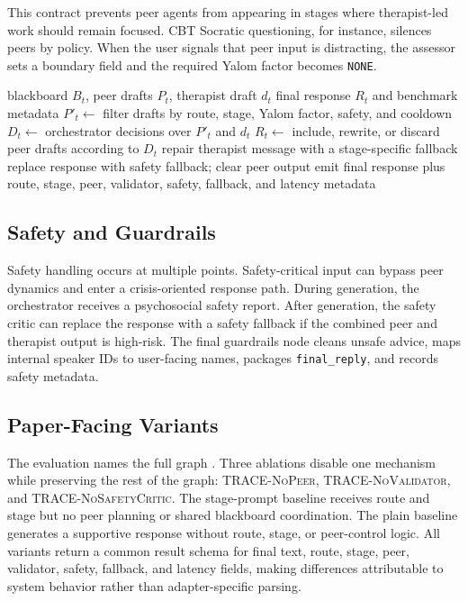 This contract prevents peer agents from appearing in stages where therapist-led work should remain focused. CBT Socratic questioning, for instance, silences peers by policy. When the user signals that peer input is distracting, the assessor sets a boundary field and the required Yalom factor becomes \texttt{NONE}.

\begin{algorithm}[t]
\small
\caption{Peer Gating and Response Finalization}
\label{alg:peer_response}
\begin{algorithmic}[1]
\Require blackboard $B_t$, peer drafts $P_t$, therapist draft $d_t$
\Ensure final response $R_t$ and benchmark metadata
\State $P'_t \gets$ filter drafts by route, stage, Yalom factor, safety, and cooldown
\State $D_t \gets$ orchestrator decisions over $P'_t$ and $d_t$
\State $R_t \gets$ include, rewrite, or discard peer drafts according to $D_t$
    \State repair therapist message with a stage-specific fallback
\EndIf
{}
    \State replace response with safety fallback; clear peer output
\EndIf
\State emit final response plus route, stage, peer, validator, safety, fallback, and latency metadata
\end{algorithmic}
\end{algorithm}

\subsection{Safety and Guardrails}
Safety handling occurs at multiple points. Safety-critical input can bypass peer dynamics and enter a crisis-oriented response path. During generation, the orchestrator receives a psychosocial safety report. After generation, the safety critic can replace the response with a safety fallback if the combined peer and therapist output is high-risk. The final guardrails node cleans unsafe advice, maps internal speaker IDs to user-facing names, packages \texttt{final\_reply}, and records safety metadata.

\subsection{Paper-Facing Variants}
The evaluation names the full graph \tracefull. Three ablations disable one mechanism while preserving the rest of the graph: \textsc{TRACE-NoPeer}, \textsc{TRACE-NoValidator}, and \textsc{TRACE-NoSafetyCritic}. The stage-prompt baseline receives route and stage but no peer planning or shared blackboard coordination. The plain baseline generates a supportive response without route, stage, or peer-control logic. All variants return a common result schema for final text, route, stage, peer, validator, safety, fallback, and latency fields, making differences attributable to system behavior rather than adapter-specific parsing.
